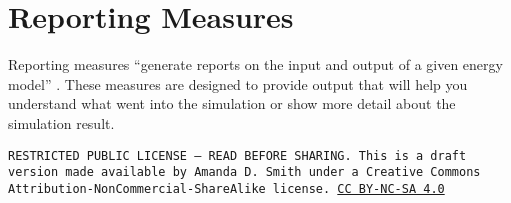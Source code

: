 \documentclass[10pt]{article}
\begin{document}




\section{Reporting Measures}

Reporting measures ``generate reports on the input and output of a given energy model'' \cite{noauthor_undated-ma}. These measures are designed to provide output that will help you understand what went into the simulation or show more detail about the simulation result.



\bigskip

\noindent
\texttt{\footnotesize RESTRICTED PUBLIC LICENSE --- READ BEFORE SHARING. This is a draft version made available by Amanda D. Smith under a Creative Commons Attribution-NonCommercial-ShareAlike license. 
\href{https://creativecommons.org/licenses/by-nc-sa/4.0/}{CC BY-NC-SA 4.0}}

\newpage
\printbibliography
\end{document}
